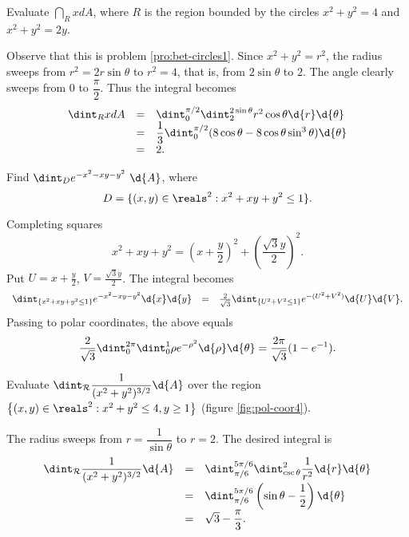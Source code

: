 \begin{exa}\label{exa:pol-coor2}
Evaluate $\dint _R xd{A}$, where $R$ is the region bounded by the
circles $x^2+y^2=4$ and $x^2+y^2=2y$.
\end{exa}
\begin{solu}
Observe that this is problem \ref{pro:bet-circles1}. Since
$x^2+y^2=r^2$, the radius sweeps from  $r^2=2r\sin \theta$ to
$r^2=4$, that is, from $2\sin \theta$ to  $2$. The angle clearly
sweeps from $0$ to $\dfrac{\pi}{2}$. Thus the integral becomes
$$\begin{array}{lll}\dint _R xd{A} & = & \dint _0 ^{\pi/2}\dint _2 
^{2\sin\theta} r^2\cos\theta \d{r}\d{\theta} \\
& = & \dfrac{1}{3}\dint _0 ^{\pi/2}(8\cos\theta 
-8\cos\theta\sin^3\theta)\d{\theta} \\
& =& 2.
 \end{array} $$
\end{solu}
\begin{exa}\label{exa:pol-coor3}
Find $\dint _D e^{-x^2-xy-y^2} \ \d{A}$, where
$$D = \{(x,y)\in \reals^2: x^2 + xy + y^2 \leq 1\}.
$$ \end{exa} \begin{solu}
 Completing squares $$ x^2 + xy + y^2 =  \left(x + \frac{y}{2}\right)^2 + 
\left(\frac{\sqrt{3}y}{2}\right)^2.  $$ Put $U= x + \frac{y}{2}$, $V= 
\frac{\sqrt{3}y}{2}$.
The integral becomes $$\begin{array}{lll}\dint _{\{x^2 + xy + y^2
\leq 1\}} e^{-x^2-xy-y^2}\d{x} \d{y} & = & \frac{2}{\sqrt{3}}\dint
_{\{U^2 +V^2 \leq 1\}} e^{-(U^2 + V^2)}\d{U} \d{V}. \end{array}
$$Passing to polar coordinates, the above equals $$ \frac{2}{\sqrt{3}}\dint _0 
^{2\pi}\dint _{0} ^1  \rho e^{-\rho^2}\d{\rho}\d{\theta} =  
\dfrac{2\pi}{\sqrt{3}} (1 - e^{-1}).   $$
\end{solu}
\begin{exa}\label{exa:pol-coor4}
Evaluate $\dint _{\cal R} \dfrac{1}{(x^2+y^2)^{3/2}}\d{A}$ over the
region $\left\{(x,y)\in\reals^2:x^2+y^2\leq 4, y\geq 1\right\}$
(figure \ref{fig:pol-coor4}).
\end{exa}
\begin{solu}
The radius sweeps from $r=\dfrac{1}{\sin\theta} $ to $r=2$. The
desired integral is $$\begin{array}{lll}\dint _{\cal R}
\dfrac{1}{(x^2+y^2)^{3/2}}\d{A} & = & \dint _{\pi/6} ^{5\pi /6} \dint
_{\csc \theta} ^{2}\dfrac{1}{r^2} \d{r}\d{\theta}\\
& = & \dint _{\pi/6} ^{5\pi /6} \left(\sin\theta-\dfrac{1}{2}\right)\d{\theta}\\
& = &\sqrt{3} -\dfrac{\pi}{3}.
\end{array}$$
\end{solu}
